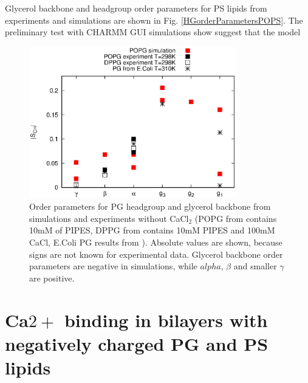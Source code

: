 \documentclass[aps,prl,superscriptaddress,twocolumn]{revtex4}
\begin{document}
Glycerol backbone and headgroup order parameters for PS lipids from experiments
and simulations are shown in Fig. \ref{HGorderParametersPOPS}.
The preliminary test with CHARMM GUI simulations show suggest that the model
\begin{figure}[]
  \centering
  \includegraphics[width=9.0cm]{../Figs/HGorderparametersPOPG.eps}
  \caption{\label{HGorderParametersPOPG}
    Order parameters for PG headgroup and glycerol backbone from simulations and experiments without CaCl$_2$ 
    (POPG from \cite{borle85} contains 10mM of PIPES, DPPG from \cite{wohlgemuth80} contains 10mM PIPES and 100mM CaCl,
    E.Coli PG results from \cite{gally81}).
    Absolute values are shown, because signs are not known for experimental data.
    Glycerol backbone order parameters are negative in simulations, while $alpha$, $\beta$ and
    smaller $\gamma$ are positive.
  }
\end{figure}

\section{Ca$2+$ binding in bilayers with negatively charged PG and PS lipids}
\end{document}
